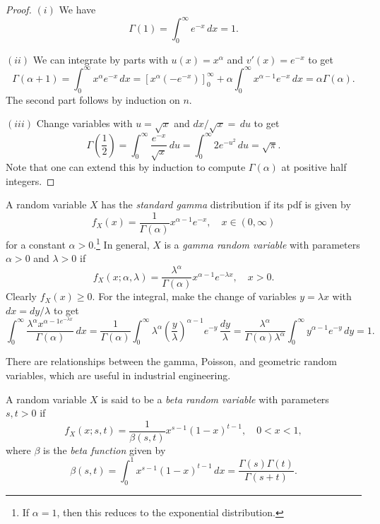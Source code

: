 \begin{proof}
  $(i)$ We have
  \[
    \Gamma(1) = \int_0^\infty e^{-x}\, dx = 1.
  \]

  $(ii)$ We can integrate by parts with
  $u(x) = x^{\alpha}$ and $v'(x) = e^{-x}$ to get
  \[
    \Gamma(\alpha + 1) = \int_0^\infty x^{\alpha} e^{-x} \, dx
    = \left[x^{\alpha} (-e^{-x})\right]_0^\infty
    + \alpha \int_0^\infty x^{\alpha - 1} e^{-x} \, dx
    = \alpha \Gamma(\alpha).
  \]
  The second part follows by induction on $n$.

  $(iii)$ Change variables with $u = \sqrt{x}$
  and $dx / \sqrt{x} = \, du$ to get
  \[
    \Gamma\left(\frac{1}{2}\right)
    = \int_0^\infty \frac{e^{-x}}{\sqrt{x}} \, du
    = \int_0^\infty 2 e^{-u^2} \, du
    = \sqrt{\pi}.
  \]
  Note that one can extend this by induction to
  compute $\Gamma(\alpha)$ at positive half integers.
\end{proof}

\begin{example}
  A random variable $X$ has the \emph{standard
  gamma} distribution if its pdf is given by
  \[
    f_X(x) = \frac{1}{\Gamma(\alpha)} x^{\alpha - 1} e^{-x},
    \quad x \in (0, \infty)
  \]
  for a constant $\alpha > 0$.\footnote{If $\alpha = 1$, then this reduces to the exponential distribution.}
  In general, $X$ is a \emph{gamma random variable}
  with parameters $\alpha > 0$ and $\lambda > 0$
  if
  \[
    f_X(x; \alpha, \lambda)
    = \frac{\lambda^{\alpha}}{\Gamma(\alpha)} x^{\alpha - 1} e^{-\lambda x},
    \quad x > 0.
  \]
  Clearly $f_X(x) \ge 0$. For the integral, make the
  change of variables $y = \lambda x$ with
  $dx = dy / \lambda$ to get
  \[
    \int_0^\infty \frac{\lambda^{\alpha} x^{\alpha - 1 e^{-\lambda x}}}{\Gamma(\alpha)} \, dx
    = \frac{1}{\Gamma(\alpha)}
    \int_{0}^\infty \lambda^\alpha \left(\frac{y}{\lambda}\right)^{\alpha - 1} e^{-y} \, \frac{dy}{\lambda}
    = \frac{\lambda^\alpha}{\Gamma(\alpha) \lambda^\alpha} \int_0^\infty y^{\alpha - 1} e^{-y} \, dy
    = 1.
  \]
\end{example}

\begin{remark}
  There are relationships between the gamma,
  Poisson, and geometric random variables, which
  are useful in industrial engineering.
\end{remark}

\begin{example}
  A random variable $X$ is said to be a
  \emph{beta random variable} with parameters
  $s, t > 0$ if
  \[
    f_X(x; s, t) = \frac{1}{\beta(s, t)} x^{s - 1} (1 - x)^{t - 1}, \quad 0 < x < 1,
  \]
  where $\beta$ is the \emph{beta function} given by
  \[
    \beta(s, t) = \int_0^1 x^{s - 1} (1 - x)^{t - 1}\, dx
    = \frac{\Gamma(s) \Gamma(t)}{\Gamma(s + t)}.
  \]
\end{example}

